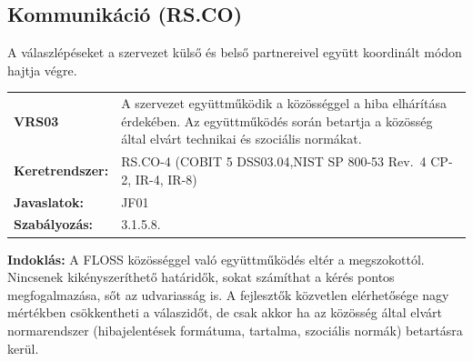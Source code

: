 \documentclass[12pt,magyar,a4paper,oneside]{scrreprt}
\begin{document}
\hypertarget{kommunikuxe1ciuxf3-rs.co}{%
\subsection{Kommunikáció (RS.CO)}\label{kommunikuxe1ciuxf3-rs.co}}

A válaszlépéseket a szervezet külső és belső partnereivel együtt
koordinált módon hajtja végre.

\begin{longtable}[]{@{}ll@{}}
\toprule
\endhead
\begin{minipage}[t]{0.16\columnwidth}\raggedright
\textbf{VRS03}\strut
\end{minipage} & \begin{minipage}[t]{0.79\columnwidth}\raggedright
A szervezet együttműködik a közösséggel a hiba elhárítása érdekében. Az
együttműködés során betartja a közösség által elvárt technikai és
szociális normákat.\strut
\end{minipage}\tabularnewline
\begin{minipage}[t]{0.16\columnwidth}\raggedright
\textbf{Keretrendszer:}\strut
\end{minipage} & \begin{minipage}[t]{0.79\columnwidth}\raggedright
RS.CO-4 (COBIT 5 DSS03.04,NIST SP 800-53 Rev.~4 CP-2, IR-4, IR-8)\strut
\end{minipage}\tabularnewline
\begin{minipage}[t]{0.16\columnwidth}\raggedright
\textbf{Javaslatok:}\strut
\end{minipage} & \begin{minipage}[t]{0.79\columnwidth}\raggedright
JF01\strut
\end{minipage}\tabularnewline
\begin{minipage}[t]{0.16\columnwidth}\raggedright
\textbf{Szabályozás:}\strut
\end{minipage} & \begin{minipage}[t]{0.79\columnwidth}\raggedright
3.1.5.8.\strut
\end{minipage}\tabularnewline
\bottomrule
\end{longtable}

\textbf{Indoklás: } A FLOSS közösséggel való együttműködés eltér a
megszokottól. Nincsenek kikényszeríthető határidők, sokat számíthat a
kérés pontos megfogalmazása, sőt az udvariasság is. A fejlesztők
közvetlen elérhetősége nagy mértékben csökkentheti a válaszidőt, de csak
akkor ha az közösség által elvárt normarendszer (hibajelentések
formátuma, tartalma, szociális normák) betartásra kerül.
\end{document}
